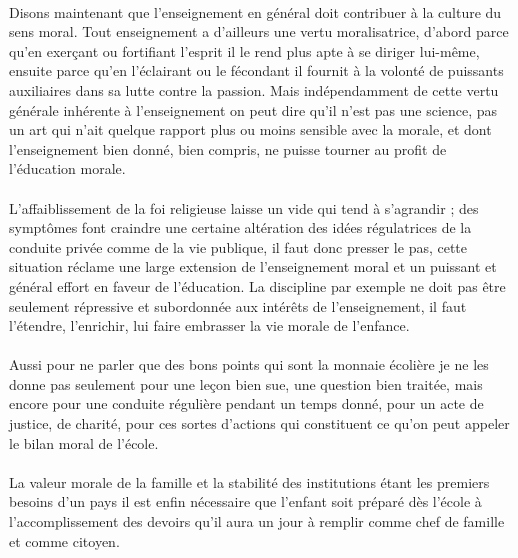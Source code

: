 \documentclass[../eBook.tex]{subfiles}
\begin{document}
    \paragraph{}Disons maintenant que l'enseignement en général doit contribuer à la culture du sens moral. Tout enseignement a d'ailleurs une vertu moralisatrice, d'abord parce qu'en exerçant ou fortifiant l'esprit il le rend plus apte à se diriger lui-même, ensuite parce qu'en l'éclairant ou le fécondant il fournit à la volonté de puissants auxiliaires dans sa lutte contre la passion. Mais indépendamment de cette vertu générale inhérente à l'enseignement on peut dire qu'il n'est pas une science, pas un art qui n'ait quelque rapport plus ou moins sensible avec la morale, et dont l'enseignement bien donné, bien compris, ne puisse tourner au profit de l'éducation morale.
    \paragraph{}L'affaiblissement de la foi religieuse laisse un vide qui tend à s'agrandir ; des symptômes font craindre une certaine altération des idées régulatrices de la conduite privée comme de la vie publique, il faut donc presser le pas, cette situation réclame une large extension de l'enseignement moral et un puissant et général effort en faveur de l'éducation. La discipline par exemple ne doit pas être seulement répressive et subordonnée aux intérêts de l'enseignement, il faut l'étendre, l'enrichir, lui faire embrasser la vie morale de l'enfance.
    \paragraph{}Aussi pour ne parler que des bons points qui sont la monnaie écolière je ne les donne pas seulement pour une leçon bien sue, une question bien traitée, mais encore pour une conduite régulière pendant un temps donné, pour un acte de justice, de charité, pour ces sortes d'actions qui constituent ce qu'on peut appeler le bilan moral de l'école.
    \paragraph{}La valeur morale de la famille et la stabilité des institutions étant les premiers besoins d'un pays il est enfin nécessaire que l'enfant soit préparé dès l'école à l'accomplissement des devoirs qu'il aura un jour à remplir comme chef de famille et comme citoyen.

    \vspace{12pt}
    \noindent\dotfill
\end{document}
